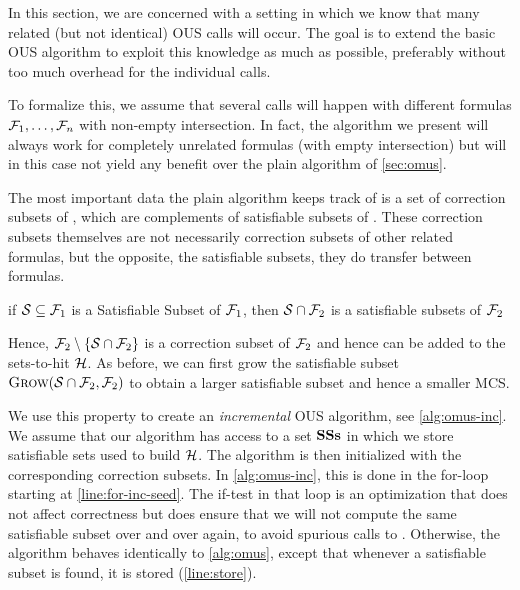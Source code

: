 In this section, we are concerned with a setting in which we know that many related (but not identical) OUS calls will occur. The goal is to extend the basic OUS algorithm to exploit this knowledge as much as possible, preferably without too much overhead for the individual calls. 

\newcommand\satsets{\mm{\mathbf{SSs}}}
\newcommand\fall{\mm{\formula_{\mathit{all}}}}
To formalize this, we assume that several \omus calls will happen with different formulas $\mathcal{F} _1,\dots,\mathcal{F} _n$ with non-empty intersection. In fact, the algorithm we present will always work for completely unrelated formulas (with empty intersection) but will in this case not yield any benefit over the plain \omus algorithm of \cref{sec:omus}. 

The most important data the plain \omus algorithm keeps track of is a set of correction subsets of \formula, which are complements of satisfiable subsets of \formula.
These correction subsets themselves are not necessarily correction subsets of other related formulas, but the opposite, the satisfiable subsets, they do transfer between formulas.

\begin{proposition}\label{prop:ss}
if $\mathcal{S} \subseteq \mathcal{F} _1$ is a Satisfiable Subset of $\mathcal{F} _1$, then $\mathcal{S}\cap \mathcal{F} _2$ is a satisfiable subsets of $\mathcal{F} _2$
\end{proposition}
Hence, $\mathcal{F} _2 \setminus \{\mathcal{S}\cap \mathcal{F} _2\}$ is a correction subset of $\mathcal{F} _2$ and hence can be added to the sets-to-hit $\mathcal{H} $. As before, we can first grow the satisfiable subset $\textsc{Grow}(\mathcal{S}\cap \mathcal{F} _2,\mathcal{F} _2)$ to obtain a larger satisfiable subset and hence a smaller MCS.

We use this property to create an \textit{incremental} OUS algorithm, see \cref{alg:omus-inc}. We assume that our algorithm has access to a set $\satsets$ in which we store satisfiable sets used to build $\mathcal{H} $. The \omus algorithm is then initialized with the corresponding correction subsets. 
In  \cref{alg:omus-inc}, this is done in the for-loop starting at \cref{line:for-inc-seed}. The if-test in that loop is an optimization that does not affect correctness but does ensure that we will not compute the same satisfiable subset over and over again, to avoid spurious calls to \grow. 
Otherwise, the algorithm behaves identically to \cref{alg:omus}, except that whenever a satisfiable subset is found, it is stored (\cref{line:store}). 
 


